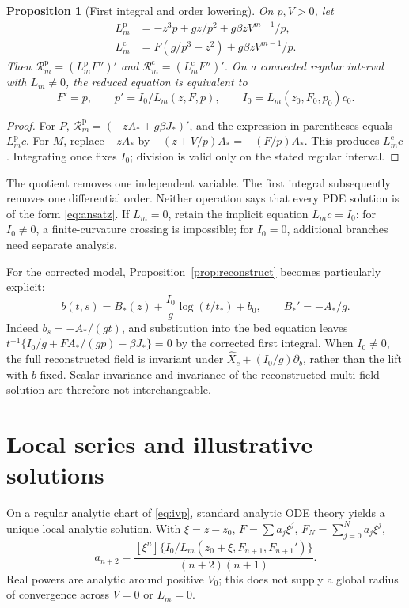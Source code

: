 \documentclass[11pt,a4paper,oneside]{report}
\numberwithin{equation}{chapter}
\newtheorem{proposition}[theorem]{Proposition}
\newcommand{\R}{\mathcal R}
\begin{document}
\begin{proposition}[First integral and order lowering]\label{prop:integral}
On $p,V>0$, let
\begin{align}
L_m^{\mathrm p}&=-z^3p+gz/p^2+g\beta zV^{m-1}/p,\label{eq:Lp}\\
L_m^{\mathrm c}&=F(g/p^3-z^2)+g\beta zV^{m-1}/p.\label{eq:Lc}
\end{align}
Then $\R_m^{\mathrm p}=(L_m^{\mathrm p}F'')'$ and $\R_m^{\mathrm c}=(L_m^{\mathrm c}F'')'$. On a connected regular interval with $L_m\ne0$, the reduced equation is equivalent to
\begin{equation}\label{eq:ivp}
F'=p,\qquad p'=I_0/L_m(z,F,p),\qquad
I_0=L_m(z_0,F_0,p_0)c_0.
\end{equation}
\end{proposition}
\begin{proof}
For $P$, $\R_m^{\mathrm p}=(-zA_*+g\beta J_*)'$, and the expression in parentheses equals $L_m^{\mathrm p}c$. For $M$, replace $-zA_*$ by $-(z+V/p)A_*=-(F/p)A_*$. This produces $L_m^{\mathrm c}c$. Integrating once fixes $I_0$; division is valid only on the stated regular interval.\end{proof}
The quotient removes one independent variable. The first integral subsequently removes one differential order. Neither operation says that every PDE solution is of the form \eqref{eq:ansatz}. If $L_m=0$, retain the implicit equation $L_mc=I_0$: for $I_0\ne0$, a finite-curvature crossing is impossible; for $I_0=0$, additional branches need separate analysis.

For the corrected model, Proposition~\ref{prop:reconstruct} becomes particularly explicit:
\begin{equation}\label{eq:bedprofile}
b(t,s)=B_*(z)+\frac{I_0}{g}\log(t/t_*)+b_0,
\qquad B_*'=-A_*/g.
\end{equation}
Indeed $b_s=-A_*/(gt)$, and substitution into the bed equation leaves
$t^{-1}\{I_0/g+FA_*/(gp)-\beta J_*\}=0$ by the corrected first integral. When $I_0\ne0$, the full reconstructed field is invariant under
$\widehat X_c+(I_0/g)\partial_b$, rather than the lift with $b$ fixed. Scalar invariance and invariance of the reconstructed multi-field solution are therefore not interchangeable.

\section{Local series and illustrative solutions}
On a regular analytic chart of \eqref{eq:ivp}, standard analytic ODE theory \cite{teschl2012} yields a unique local analytic solution. With $\xi=z-z_0$, $F=\sum a_j\xi^j$, $F_N=\sum_{j=0}^Na_j\xi^j$,
\begin{equation}\label{eq:recurrence}
a_{n+2}=\frac{[\xi^n]\{I_0/L_m(z_0+\xi,F_{n+1},F_{n+1}')\}}{(n+2)(n+1)}.
\end{equation}
Real powers are analytic around positive $V_0$; this does not supply a global radius of convergence across $V=0$ or $L_m=0$.
\end{document}
